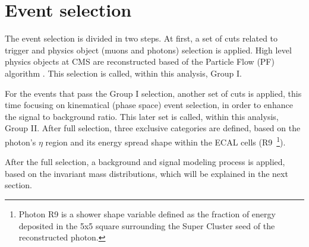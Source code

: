 \clearpage

\section{Event selection}
\label{sec:selection}

The event selection is divided in two steps. At first, a set of cuts related to trigger and physics object (muons and photons) selection is applied. High level physics objects at CMS are reconstructed based of the Particle Flow (PF) algorithm \cite{PF_paper_2016}. This selection is called, within this analysis, Group I. 

For the events that pass the Group I selection, another set of cuts is applied, this time focusing on kinematical (phase space) event selection, in order to enhance the signal to background ratio. This later set is called, within this analysis, Group II. After full selection, three exclusive categories are defined, based on the photon's $\eta$ region and its energy spread shape within the ECAL cells (R9~\footnote{Photon R9 is a shower shape variable defined as the fraction of energy deposited in the 5x5 square surrounding the Super Cluster seed of the reconstructed photon.}).


After the full selection, a background and signal modeling process is applied, based on the invariant mass distributions, which will be explained in the next section.


